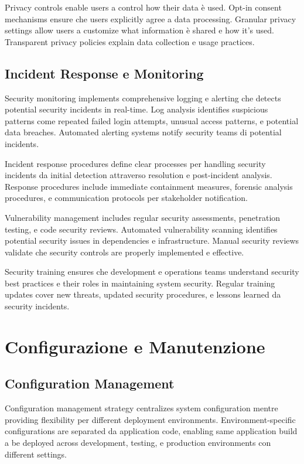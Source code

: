 \documentclass[12pt,a4paper]{article}
\begin{document}
Privacy controls enable users a control how their data è used. Opt-in consent mechanisms ensure che users explicitly agree a data processing. Granular privacy settings allow users a customize what information è shared e how it's used. Transparent privacy policies explain data collection e usage practices.

\subsection{Incident Response e Monitoring}

Security monitoring implements comprehensive logging e alerting che detects potential security incidents in real-time. Log analysis identifies suspicious patterns come repeated failed login attempts, unusual access patterns, e potential data breaches. Automated alerting systems notify security teams di potential incidents.

Incident response procedures define clear processes per handling security incidents da initial detection attraverso resolution e post-incident analysis. Response procedures include immediate containment measures, forensic analysis procedures, e communication protocols per stakeholder notification.

Vulnerability management includes regular security assessments, penetration testing, e code security reviews. Automated vulnerability scanning identifies potential security issues in dependencies e infrastructure. Manual security reviews validate che security controls are properly implemented e effective.

Security training ensures che development e operations teams understand security best practices e their roles in maintaining system security. Regular training updates cover new threats, updated security procedures, e lessons learned da security incidents.

\section{Configurazione e Manutenzione}

\subsection{Configuration Management}

Configuration management strategy centralizes system configuration mentre providing flexibility per different deployment environments. Environment-specific configurations are separated da application code, enabling same application build a be deployed across development, testing, e production environments con different settings.
\end{document}
